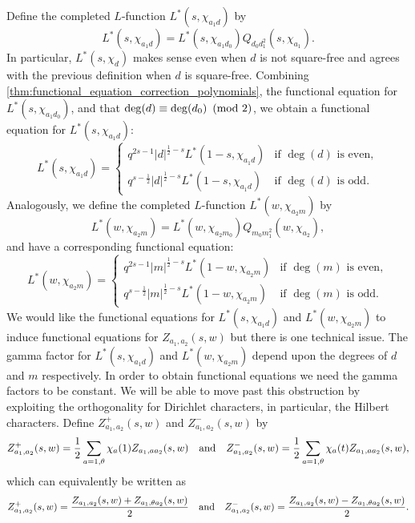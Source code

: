 \documentclass[12pt,reqno,oneside]{amsart}
\begin{document}
    Define the completed $L$-function $L^{\ast}(s,\chi_{a_{1}d})$ by
    \[
        L^{\ast}(s,\chi_{a_{1}d}) = L^{\ast}(s,\chi_{a_{1}d_{0}})Q_{d_{0}d_{1}^{2}}(s,\chi_{a_{1}}).
    \]
    In particular, $L^{\ast}(s,\chi_{d})$ makes sense even when $d$ is not square-free and agrees with the previous definition when $d$ is square-free.
    Combining \cref{thm:functional_equation_correction_polynomials}, the functional equation for $L^{\ast}(s,\chi_{a_{1}d_{0}})$, and that $\deg(d) \equiv \deg(d_{0}) \ \left(\text{mod }2\right)$, we obtain a functional equation for $L^{\ast}(s,\chi_{a_{1}d})$:
    \[
        L^{\ast}(s,\chi_{a_{1}d}) = \begin{cases} q^{2s-1}|d|^{\frac{1}{2}-s}L^{\ast}(1-s,\chi_{a_{1}d}) & \text{if $\deg(d)$ is even}, \\ q^{s-\frac{1}{2}}|d|^{\frac{1}{2}-s}L^{\ast}(1-s,\chi_{a_{1}d}) & \text{if $\deg(d)$ is odd}. \end{cases}
    \]
    Analogously, we define the completed $L$-function $L^{\ast}(w,\chi_{a_{2}m})$ by
    \[
        L^{\ast}(w,\chi_{a_{2}m}) = L^{\ast}(w,\chi_{a_{2}m_{0}})Q_{m_{0}m_{1}^{2}}(w,\chi_{a_{2}}),
    \]
    and have a corresponding functional equation:
    \[
        L^{\ast}(w,\chi_{a_{2}m}) = \begin{cases} q^{2s-1}|m|^{\frac{1}{2}-s}L^{\ast}(1-w,\chi_{a_{2}m}) & \text{if $\deg(m)$ is even}, \\ q^{s-\frac{1}{2}}|m|^{\frac{1}{2}-s}L^{\ast}(1-w,\chi_{a_{2}m}) & \text{if $\deg(m)$ is odd}. \end{cases}
    \]
    We would like the functional equations for $L^{\ast}(s,\chi_{a_{1}d})$ and $L^{\ast}(w,\chi_{a_{2}m})$ to induce functional equations for $Z_{a_{1},a_{2}}(s,w)$ but there is one technical issue. The gamma factor for $L^{\ast}(s,\chi_{a_{1}d})$ and $L^{\ast}(w,\chi_{a_{2}m})$ depend upon the degrees of $d$ and $m$ respectively. In order to obtain functional equations we need the gamma factors to be constant. We will be able to move past this obstruction by exploiting the orthogonality for Dirichlet characters, in particular, the Hilbert characters. Define $Z_{a_{1},a_{2}}^{+}(s,w)$ and $Z_{a_{1},a_{2}}^{-}(s,w)$ by
    \[
        Z_{a_{1},a_{2}}^{+}(s,w) = \frac{1}{2}\sum_{a = 1,\theta}\chi_{a}(1)Z_{a_{1},aa_{2}}(s,w) \quad \text{and} \quad Z_{a_{1},a_{2}}^{-}(s,w) = \frac{1}{2}\sum_{a = 1,\theta}\chi_{a}(t)Z_{a_{1},aa_{2}}(s,w),
    \]
    which can equivalently be written as
    \[
        Z_{a_{1},a_{2}}^{+}(s,w) = \frac{Z_{a_{1},a_{2}}(s,w)+{Z_{a_{1},\theta a_{2}}(s,w)}}{2} \quad \text{and} \quad Z_{a_{1},a_{2}}^{-}(s,w) = \frac{Z_{a_{1},a_{2}}(s,w)-{Z_{a_{1},\theta a_{2}}(s,w)}}{2}.
    \]
\end{document}
